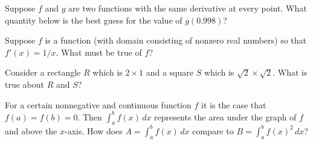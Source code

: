 \documentclass{ximera}
\newcommand{\recommendation}[1]{}
\begin{document}
\begin{shuffle}
\begin{problem}
  Suppose $f$ and $g$ are two functions with the same derivative at every point.  What quantity below is the best guess for the value of $g(0.998)$?
  \begin{multipleChoice}
  \end{multipleChoice}
\end{problem}


\begin{problem}
  Suppose $f$ is a function (with domain consisting of nonzero real numbers) so that $f'(x) = 1/x$.  What must be true of $f$?
  \begin{multipleChoice}
  \end{multipleChoice}
\end{problem}


\begin{problem}
  Consider a rectangle $R$ which is $2 \times 1$ and a square $S$
  which is $\sqrt{2} \times \sqrt{2}$.  What is true about $R$ and
  $S$?
  \begin{multipleChoice}
  \end{multipleChoice}
\end{problem}

\begin{problem}
  For a certain nonnegative and continuous function $f$ it is the case
  that $f(a) = f(b) = 0$.  Then $\int_a^b f(x) \, dx$ represents the
  area under the graph of $f$ and above the $x$-axis.  How does $A = \int_a^b f(x) \, dx$ compare to $B = \int_a^b f(x)^2 \, dx$?
  \begin{multipleChoice}
  \end{multipleChoice}
\end{problem}


\end{shuffle}
\end{document}
